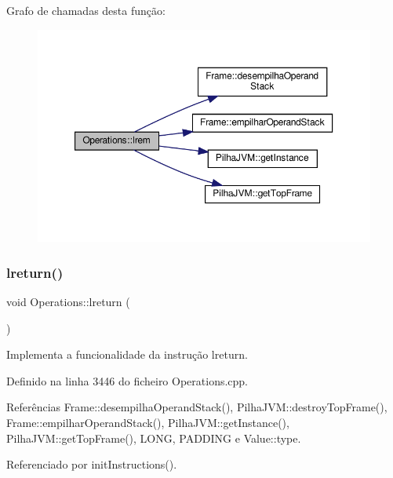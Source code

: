 Grafo de chamadas desta função\+:
\nopagebreak
\begin{figure}[H]
\begin{center}
\leavevmode
\includegraphics[width=350pt]{classOperations_a437e4b34f2f1be8982d36f0cdf47f98c_cgraph}
\end{center}
\end{figure}
\mbox{\label{classOperations_adbc4db2dbfcae7185bc9b7a005e988ea}} 
\subsubsection{\texorpdfstring{lreturn()}{lreturn()}}
{\footnotesize\ttfamily void Operations\+::lreturn (\begin{DoxyParamCaption}{ }\end{DoxyParamCaption})\hspace{0.3cm}{\ttfamily [private]}}



Implementa a funcionalidade da instrução lreturn. 



Definido na linha 3446 do ficheiro Operations.\+cpp.



Referências Frame\+::desempilha\+Operand\+Stack(), Pilha\+J\+V\+M\+::destroy\+Top\+Frame(), Frame\+::empilhar\+Operand\+Stack(), Pilha\+J\+V\+M\+::get\+Instance(), Pilha\+J\+V\+M\+::get\+Top\+Frame(), L\+O\+NG, P\+A\+D\+D\+I\+NG e Value\+::type.



Referenciado por init\+Instructions().

